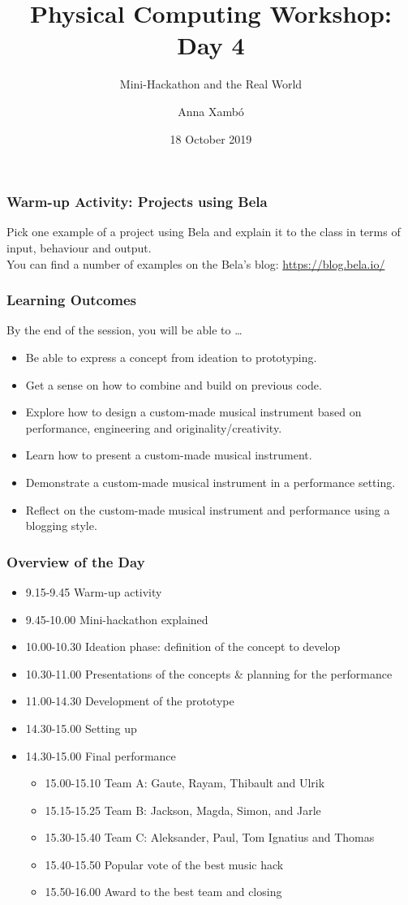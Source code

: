 \documentclass[screen, aspectratio=169]{beamer}
\title[PCW-d1]{Physical Computing Workshop: Day 4}
\subtitle{Mini-Hackathon and the Real World}
\author[A. Xamb{\'o}]{Anna Xamb{\'o}}
\institute[NTNU]{Department of Music, NTNU}
\date{18 October 2019}
\begin{document}
\begin{frame}
  \titlepage
\end{frame}
%
\usebackgroundtemplate{}
\begin{frame}
\frametitle{Warm-up Activity: Projects using Bela}
Pick one example of a project using Bela and explain it to the class in terms of input, behaviour and output. \\
You can find a number of examples on the Bela's blog: \url{https://blog.bela.io/}
\end{frame}
%
\begin{frame}
  \frametitle{Learning Outcomes}
  By the end of the session, you will be able to \dots
  \begin{itemize}
    \item Be able to express a concept from ideation to prototyping.
    \item Get a sense on how to combine and build on previous code.
    \item Explore how to design a custom-made musical instrument based on performance, engineering and originality/creativity.  
    \item Learn how to present a custom-made musical instrument.
    \item Demonstrate a custom-made musical instrument in a performance setting.
    \item Reflect on the custom-made musical instrument and performance using a blogging style.
  \end{itemize}
\end{frame}
%
\begin{frame}
  \frametitle{Overview of the Day}
      \begin{itemize}
	\item 9.15-9.45 Warm-up activity
	\item 9.45-10.00 Mini-hackathon explained
	\item 10.00-10.30 Ideation phase: definition of the concept to develop
	\item 10.30-11.00 Presentations of the concepts \& planning for the performance
	\item 11.00-14.30 Development of the prototype
	\item 14.30-15.00 Setting up
	\item 14.30-15.00 Final performance
	\begin{itemize}
	\item 15.00-15.10 Team A: Gaute, Rayam, Thibault and Ulrik
	\item 15.15-15.25 Team B: Jackson, Magda, Simon, and Jarle 
	\item 15.30-15.40 Team C: Aleksander, Paul, Tom Ignatius and Thomas
	\item 15.40-15.50 Popular vote of the best music hack
	\item 15.50-16.00 Award to the best team and closing
	\end{itemize}
    \end{itemize}  
\end{frame}
\end{document}
